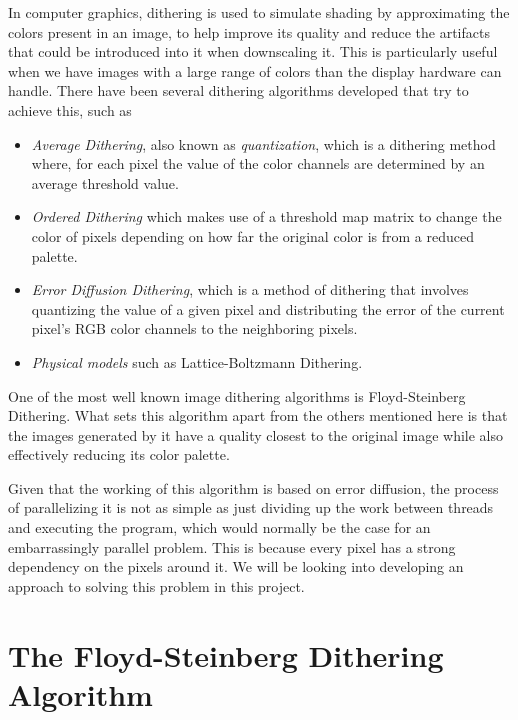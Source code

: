 \documentclass{article}
\begin{document}
\medskip
\noindent In computer graphics, dithering is used to simulate shading by approximating the colors present in an image, to help improve its quality and reduce the artifacts that could be introduced into it when downscaling it. This is particularly useful when we have images with a large range of colors than the display hardware can handle. There have been several dithering algorithms developed that try to achieve this, such as

\begin{itemize}
    \item \textit{Average Dithering}, also known as \textit{quantization}, which is a dithering method where, for each pixel the value of the color channels are determined by an average threshold value.

    \item \textit{Ordered Dithering} which makes use of a threshold map matrix to change the color of pixels depending on how far the original color is from a reduced palette.

    \item \textit{Error Diffusion Dithering}, which is a method of dithering that involves quantizing the value of a given pixel and distributing the error of the current pixel's RGB color channels to the neighboring pixels.

    \item \textit{Physical models} such as Lattice-Boltzmann Dithering\cite{Hagenburg}.

\end{itemize}

\medskip
\noindent One of the most well known image dithering algorithms is Floyd-Steinberg Dithering\cite{Steinberg}. What sets this algorithm apart from the others mentioned here is that the images generated by it have a quality closest to the original image while also effectively reducing its color palette.

\medskip
\noindent Given that the working of this algorithm is based on error diffusion, the process of parallelizing it is not as simple as just dividing up the work between threads and executing the program, which would normally be the case for an embarrassingly parallel problem. This is because every pixel has a strong dependency on the pixels around it. We will be looking into developing an approach to solving this problem in this project.

\section{The Floyd-Steinberg Dithering Algorithm}\label{Floyd-Steinberg Dithering}
\end{document}
